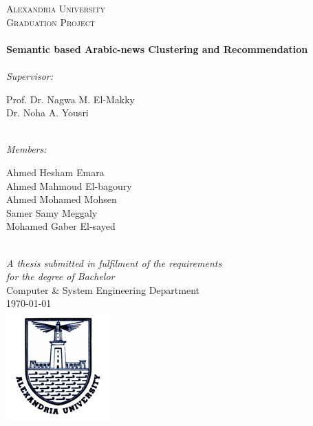 \documentclass[11pt, a4paper, oneside]{Thesis} %
\begin{document}
\begin{titlepage}
\begin{center}

\textsc{\LARGE Alexandria University}\\[1.5cm] %
\textsc{\Large Graduation Project}\\[0.5cm] %

\HRule \\[0.4cm] %
{\huge \bfseries Semantic based Arabic-news Clustering and Recommendation}\\[0.4cm] %
\HRule \\[1cm] %

\large \textit{Supervisor:}\\[0.4cm]
\begin{minipage}{0.4\textwidth}
\begin{center} \large
Prof. Dr. Nagwa M. El-Makky\\
Dr. Noha A. Yousri 
\end{center}
\end{minipage}\\[1cm]
 
\large \textit{Members:}\\[0.4cm]
\begin{minipage}{0.4\textwidth}
\begin{center} \large
Ahmed Hesham Emara \\  Ahmed Mahmoud El-bagoury \\ 
Ahmed Mohamed Mohsen \\ Samer Samy Meggaly \\
Mohamed Gaber El-sayed
\end{center}
\end{minipage}\\[1cm]
 
\large \textit{A thesis submitted in fulfilment of the requirements\\ for the degree of Bachelor }\\[0.4cm] %
Computer \& System Engineering Department\\[0.7cm] %
 
{\large \today}\\[0.4cm] %
\includegraphics{./Figures/Logo_Alexandria_University.png} %
\vfill 
\end{center}

\end{titlepage}
\end{document}
